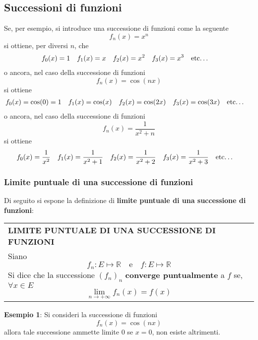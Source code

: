 \documentclass[a4paper]{extarticle}
\renewcommand\arraystretch{}
\begin{document}
\vspace{1em}
\subsection{Successioni di funzioni}
Se, per esempio, si introduce una successione di funzioni come la seguente
\[f_n(x) = x^n\]
si ottiene, per diversi $n$, che
\begin{align*}
    &f_0(x)=1&&f_1(x)=x&&f_2(x)=x^2&&f_3(x)=x^3&&\text{etc\dots}
\end{align*}
o ancora, nel caso della successione di funzioni
\[f_n(x) = \cos(nx)\]
si ottiene
\begin{align*}
    &f_0(x)=\cos(0)=1&&f_1(x)=\cos(x)&&f_2(x)=\cos(2x)&&f_3(x)=\cos(3x)&&\text{etc\dots}
\end{align*}
o ancora, nel caso della successione di funzioni
\[f_n(x) = \frac{1}{x^2+n}\]
si ottiene
\begin{align*}
    &f_0(x)=\frac{1}{x^2}&&f_1(x)=\frac{1}{x^2+1}&&f_2(x)=\frac{1}{x^2+2}&&f_3(x)=\frac{1}{x^2+3}&&\text{etc\dots}
\end{align*}

\vspace{1em}
\noindent
\subsubsection{Limite puntuale di una successione di funzioni}
Di seguito si espone la definizione di \textbf{limite puntuale di una successione di funzioni}:

\vspace{1em}
\setlength{\tabcolsep}{14pt}
\renewcommand{\arraystretch}{2}
\noindent
\begin{tabularx}{\textwidth}{@{}|P|@{}}
    \hline
    {\textbf{LIMITE PUNTUALE DI UNA SUCCESSIONE DI FUNZIONI}}\\
    \parbox{\linewidth}{Siano
    \[f_n : E \longmapsto \mathbb{R} \hspace{1em} \text{e} \hspace{1em} f : E \longmapsto \mathbb{R}\]
    Si dice che la successione $\left(f_n\right)_n$ \textbf{converge puntualmente} a $f$ se, $\forall x \in E$
    \[\lim_{n \to +\infty} f_n(x) = f(x)\] \vspace{-1mm}}\\
    \hline
\end{tabularx}

\vspace{1em}
\noindent
\textbf{Esempio 1}: Si consideri la successione di funzioni
\[f_n(x) = \cos(nx)\]
allora tale successione ammette limite $0$ se $x=0$, non esiste altrimenti.
\end{document}
